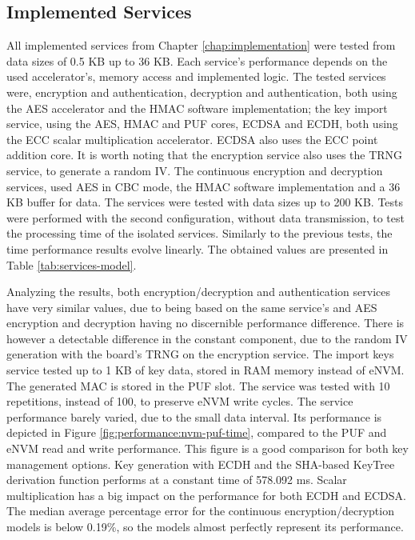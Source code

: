 \subsection{Implemented Services}\label{chap:evaluation:services}

All implemented services from Chapter \ref{chap:implementation} were tested from data sizes of 0.5 KB up to 36 KB. Each service's performance depends on the used accelerator's, memory access and implemented logic.
The tested services were, encryption and authentication, decryption and authentication, both using the AES accelerator and the HMAC software implementation; the key import service, using the AES, HMAC and PUF cores, ECDSA and ECDH, both using the ECC scalar multiplication accelerator. ECDSA also uses the ECC point addition core. It is worth noting that the encryption service also uses the TRNG service, to generate a random IV. The continuous encryption and decryption services, used AES in CBC mode, the HMAC software implementation and a 36 KB buffer for data. The services were tested with data sizes up to 200 KB.
Tests were performed with the second configuration, without data transmission, to test the processing time of the isolated services.
Similarly to the previous tests, the time performance results evolve linearly. The obtained values are presented in Table \ref{tab:services-model}.



Analyzing the results, both encryption/decryption and authentication services have very similar values, due to being based on the same service's and AES encryption and decryption having no discernible performance difference.
There is however a detectable difference in the constant component, due to the random IV generation with the board's TRNG on the encryption service.
The import keys service tested up to 1 KB of key data, stored in RAM memory instead of eNVM. The generated MAC is stored in the PUF slot. The service was tested with 10 repetitions, instead of 100, to preserve eNVM write cycles.
The service performance barely varied, due to the small data interval. Its performance is depicted in Figure \ref{fig:performance:nvm-puf-time}, compared to the PUF and eNVM read and write performance. This figure is a good comparison for both key management options.
Key generation with ECDH and the SHA-based KeyTree derivation function performs at a constant time of 578.092 ms.
Scalar multiplication has a big impact on the performance for both ECDH and ECDSA.
The median average percentage error for the continuous encryption/decryption models is below 0.19\%, so the models almost perfectly represent its performance.%

